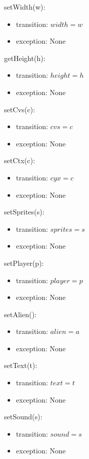 \documentclass[12pt]{article}
\begin{document}
setWidth(w):
\begin{itemize}
    \item transition: $width = w$
    \item exception: None
\end{itemize}

getHeight(h):
\begin{itemize}
    \item transition: $height = h$
    \item exception: None
\end{itemize}

setCvs(c):
\begin{itemize}
    \item transition: $cvs = c$
    \item exception: None
\end{itemize}

setCtx(c):
\begin{itemize}
    \item transition: $cyx = c$
    \item exception: None
\end{itemize}

setSprites(s):
\begin{itemize}
    \item transition: $sprites = s$
    \item exception: None
\end{itemize}

setPlayer(p):
\begin{itemize}
    \item transition: $player = p$
    \item exception: None
\end{itemize}

setAlien():
\begin{itemize}
    \item transition: $alien = a$
    \item exception: None
\end{itemize}

setText(t):
\begin{itemize}
    \item transition: $text = t$
    \item exception: None
\end{itemize}

setSound(s):
\begin{itemize}
    \item transition: $sound = s$
    \item exception: None
\end{itemize}
\end{document}
